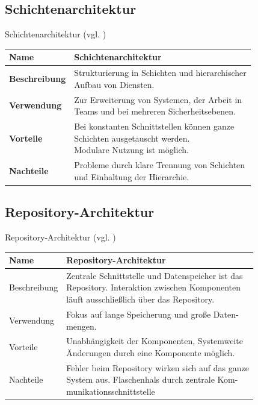 \documentclass{beamer}
\begin{document}
			\subsection{Schichtenarchitektur}
			\begin{frame}{Schichtenarchitektur (vgl. \cite[ S. 194]{sommer})}
			\begin{tabular}{*{2}{l}}
				\toprule
				\textbf{Name}&\textbf{Schichtenarchitektur}\\
				\midrule
				\midrule
				\textbf{Beschreibung}&\makecell[l]{Strukturierung in Schichten und hierarchischer\\ Aufbau von Diensten.}\\
				\midrule
				\textbf{Verwendung}&\makecell[l]{Zur Erweiterung von Systemen, der Arbeit in\\ Teams und bei mehreren Sicherheitsebenen.}\\
				\midrule
				\textbf{Vorteile}&\makecell[l]{Bei konstanten Schnittstellen können ganze\\ Schichten ausgetauscht werden.\\ Modulare Nutzung ist möglich.}\\
				\midrule
				\textbf{Nachteile}&\makecell[l]{Probleme durch klare Trennung von Schichten\\ und Einhaltung der Hierarchie.}\\
				\bottomrule
			\end{tabular}
			\end{frame}
			\subsection{Repository-Architektur}
			\begin{frame}{Repository-Architektur (vgl. \cite[ S. 196f]{sommer})}
			\begin{tabular}{*{2}{l}}
				\toprule
				\textbf{Name}&\textbf{Repository-Architektur}\\
				\midrule
				\midrule
				Beschreibung&\makecell[l]{Zentrale Schnittstelle und Datenspeicher ist das\\ Repository. Interaktion zwischen Komponenten\\ läuft ausschließlich über das Repository.}\\
				\midrule
				Verwendung&\makecell[l]{Fokus auf lange Speicherung und große Daten-\\mengen.}\\
				\midrule
				Vorteile&\makecell[l]{Unabhängigkeit der Komponenten, Systemweite\\ Änderungen durch eine Komponente möglich.}\\
				\midrule
				Nachteile&\makecell[l]{Fehler beim Repository wirken sich auf das ganze\\ System aus. Flaschenhals durch zentrale Kom-\\munikationsschnittstelle}\\
				\bottomrule
			\end{tabular}
			\end{frame}	
\end{document}
